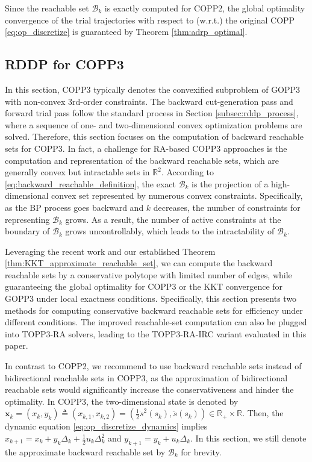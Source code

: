 \documentclass[journal]{IEEEtran}
\theoremstyle{definition}
\theoremstyle{definition}
\newcommand\R{{\mathbb{R}}}
\renewcommand\vector[1]{\boldsymbol{#1}}
\newcommand\vx{{\vector{x}}}
\begin{document}
Since the reachable set $\mathcal{B}_k$ is exactly computed for COPP2, the global optimality convergence of the trial trajectories with respect to (w.r.t.) the original COPP \eqref{eq:op_discretize} is guaranteed by Theorem \ref{thm:adrp_optimal}.

\subsection{RDDP for COPP3}\label{subsec:ardp_copp3}

In this section, COPP3 typically denotes the convexified subproblem of GOPP3 with non-convex 3rd-order constraints. The backward cut-generation pass and forward trial pass follow the standard process in Section \ref{subsec:rddp_process}, where a sequence of one- and two-dimensional convex optimization problems are solved. Therefore, this section focuses on the computation of backward reachable sets for COPP3. In fact, a challenge for RA-based COPP3 approaches is the computation and representation of the backward reachable sets, which are generally convex but intractable sets in $\R^2$. According to \eqref{eq:backward_reachable_definition}, the exact $\mathcal{B}_k$ is the projection of a high-dimensional convex set represented by numerous convex constraints. Specifically, as the BP process goes backward and $k$ decreases, the number of constraints for representing $\mathcal{B}_k$ grows. As a result, the number of active constraints at the boundary of $\mathcal{B}_k$ grows uncontrollably, which leads to the intractability of $\mathcal{B}_k$.

Leveraging the recent work \cite{dio2025time} and our established Theorem \ref{thm:KKT_approximate_reachable_set}, we can compute the backward reachable sets by a conservative polytope with limited number of edges, while guaranteeing the global optimality for COPP3 or the KKT convergence for GOPP3 under local exactness conditions. Specifically, this section presents two methods for computing conservative backward reachable sets for efficiency under different conditions. The improved reachable-set computation can also be plugged into TOPP3-RA solvers, leading to the TOPP3-RA-IRC variant evaluated in this paper.

In contrast to COPP2, we recommend to use backward reachable sets instead of bidirectional reachable sets in COPP3, as the approximation of bidirectional reachable sets would significantly increase the conservativeness and hinder the optimality. In COPP3, the two-dimensional state is denoted by $\vx_k=(x_k,y_k)\triangleq (x_{k,1},x_{k,2})=(\frac12\dot{s}^2(s_k),\ddot{s}(s_k))\in\R_+\times\R$. Then, the dynamic equation \eqref{eq:op_discretize_dynamics} implies $x_{k+1}=x_k+y_k\Delta_k+\frac12u_k\Delta_k^2$ and $y_{k+1}=y_k+u_k\Delta_k$. In this section, we still denote the approximate backward reachable set by $\mathcal{B}_k$ for brevity.
\end{document}
